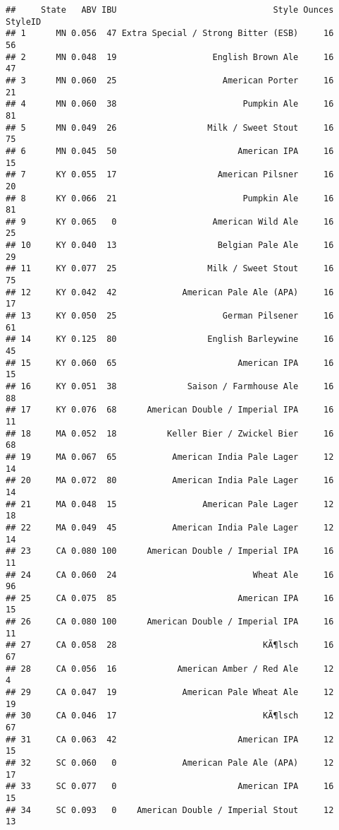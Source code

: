 \documentclass[
]{article}
\begin{document}
\begin{verbatim}
##     State   ABV IBU                               Style Ounces StyleID
## 1      MN 0.056  47 Extra Special / Strong Bitter (ESB)     16      56
## 2      MN 0.048  19                   English Brown Ale     16      47
## 3      MN 0.060  25                     American Porter     16      21
## 4      MN 0.060  38                         Pumpkin Ale     16      81
## 5      MN 0.049  26                  Milk / Sweet Stout     16      75
## 6      MN 0.045  50                        American IPA     16      15
## 7      KY 0.055  17                    American Pilsner     16      20
## 8      KY 0.066  21                         Pumpkin Ale     16      81
## 9      KY 0.065   0                   American Wild Ale     16      25
## 10     KY 0.040  13                    Belgian Pale Ale     16      29
## 11     KY 0.077  25                  Milk / Sweet Stout     16      75
## 12     KY 0.042  42             American Pale Ale (APA)     16      17
## 13     KY 0.050  25                     German Pilsener     16      61
## 14     KY 0.125  80                  English Barleywine     16      45
## 15     KY 0.060  65                        American IPA     16      15
## 16     KY 0.051  38              Saison / Farmhouse Ale     16      88
## 17     KY 0.076  68      American Double / Imperial IPA     16      11
## 18     MA 0.052  18          Keller Bier / Zwickel Bier     16      68
## 19     MA 0.067  65           American India Pale Lager     12      14
## 20     MA 0.072  80           American India Pale Lager     16      14
## 21     MA 0.048  15                 American Pale Lager     12      18
## 22     MA 0.049  45           American India Pale Lager     12      14
## 23     CA 0.080 100      American Double / Imperial IPA     16      11
## 24     CA 0.060  24                           Wheat Ale     16      96
## 25     CA 0.075  85                        American IPA     16      15
## 26     CA 0.080 100      American Double / Imperial IPA     16      11
## 27     CA 0.058  28                             KÃ¶lsch     16      67
## 28     CA 0.056  16            American Amber / Red Ale     12       4
## 29     CA 0.047  19             American Pale Wheat Ale     12      19
## 30     CA 0.046  17                             KÃ¶lsch     12      67
## 31     CA 0.063  42                        American IPA     12      15
## 32     SC 0.060   0             American Pale Ale (APA)     12      17
## 33     SC 0.077   0                        American IPA     16      15
## 34     SC 0.093   0    American Double / Imperial Stout     12      13

\end{verbatim}
\end{document}
